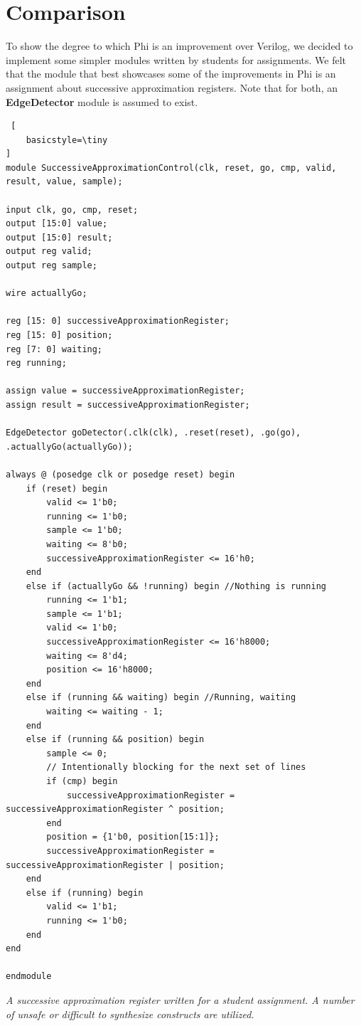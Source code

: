 \documentclass[10pt, two column]{article}
\theoremstyle{definition}
\begin{document}
\section{Comparison}
To show the degree to which Phi is an improvement over Verilog, we decided to implement some simpler modules written by students for assignments. We felt that the module that best showcases some of the improvements in Phi is an assignment about successive approximation registers. Note that for both, an \textbf{EdgeDetector} module is assumed to exist.

\begin{lstlisting} [
    basicstyle=\tiny
]
module SuccessiveApproximationControl(clk, reset, go, cmp, valid, result, value, sample);

input clk, go, cmp, reset;
output [15:0] value;
output [15:0] result;
output reg valid;
output reg sample;

wire actuallyGo;

reg [15: 0] successiveApproximationRegister;
reg [15: 0] position;
reg [7: 0] waiting;
reg running;

assign value = successiveApproximationRegister;
assign result = successiveApproximationRegister;

EdgeDetector goDetector(.clk(clk), .reset(reset), .go(go), .actuallyGo(actuallyGo));

always @ (posedge clk or posedge reset) begin
    if (reset) begin
        valid <= 1'b0;
        running <= 1'b0;
        sample <= 1'b0;
        waiting <= 8'b0;
        successiveApproximationRegister <= 16'h0;
    end
    else if (actuallyGo && !running) begin //Nothing is running
        running <= 1'b1;
        sample <= 1'b1;
        valid <= 1'b0;
        successiveApproximationRegister <= 16'h8000;
        waiting <= 8'd4;
        position <= 16'h8000;
    end
    else if (running && waiting) begin //Running, waiting
        waiting <= waiting - 1;
    end
    else if (running && position) begin 
        sample <= 0;
        // Intentionally blocking for the next set of lines
        if (cmp) begin
            successiveApproximationRegister = successiveApproximationRegister ^ position;
        end
        position = {1'b0, position[15:1]};
        successiveApproximationRegister = successiveApproximationRegister | position;
    end
    else if (running) begin
        valid <= 1'b1;
        running <= 1'b0;
    end
end

endmodule
\end{lstlisting}
\begin{center}
\textit{A successive approximation register written for a student assignment. A number of unsafe or difficult to synthesize constructs are utilized.}
\end{center}
\end{document}
